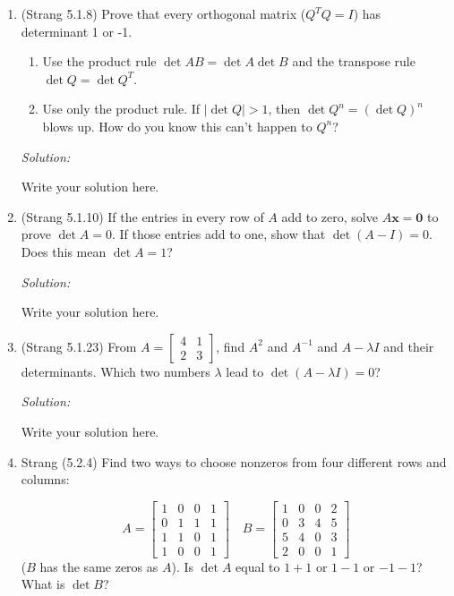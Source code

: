 \documentclass[11pt]{article}
\renewcommand{\vec}[1]{\ensuremath{\mathbf{#1}}}
\newenvironment{sol}
    {\emph{Solution:}
    }
\newcommand{\headings}{
\large{\textbf{YOUR NAME GOES HERE \hfill 21-241 Fall 2019}\\
\textbf{Homework 7 \hfill Due Friday, October 18}}\\
\rule[0.1in]{\textwidth}{0.01in}
}
\begin{document}
\headings




\begin{enumerate}
\section*{Required Problems}



\item (Strang 5.1.8) Prove that every orthogonal matrix ($Q^TQ=I$) has determinant 1 or -1.

\begin{enumerate}
\item Use the product rule $\det AB = \det A \det B$ and the transpose rule $\det Q = \det Q^T$.
\item Use only the product rule.  If $|\det Q|>1$, then $\det Q^n = (\det Q)^n$ blows up.  How do you know this can't happen to $Q^n$?
\end{enumerate}

 \begin{sol}
Write your solution here.
\end{sol}
\clearpage

\item (Strang 5.1.10) If the entries in every row of $A$ add to zero, solve $A\vec{x} = \vec{0}$ to prove $\det A = 0$. If those entries add to one, show that $\det(A-I) = 0$. Does this mean $\det A = 1$?

 \begin{sol}
Write your solution here.
\end{sol}
\clearpage

\item (Strang 5.1.23) From $A = \begin{bmatrix} 4 & 1 \\ 2 & 3 \end{bmatrix}$, find $A^2$ and $A^{-1}$ and $A-\lambda I$ and their determinants.  Which two numbers $\lambda$ lead to $\det (A- \lambda I) = 0$?


 \begin{sol}
Write your solution here.
\end{sol}
\clearpage

\item Strang (5.2.4) Find two ways to choose nonzeros from four different rows and columns:

\[A= \begin{bmatrix} 1 & 0 & 0 & 1 \\ 0 & 1 & 1 & 1 \\ 1 & 1 & 0 & 1 \\ 1 & 0 & 0 & 1 \end{bmatrix} \quad 
B = \begin{bmatrix} 1 & 0 & 0 & 2 \\ 0 & 3 & 4 & 5 \\ 5 & 4 & 0 & 3 \\ 2 & 0 & 0 & 1 \end{bmatrix}\]
($B$ has the same zeros as $A$). Is $\det A$ equal to $1+1$ or $1-1$ or $-1-1$?  What is $\det B$?


\end{enumerate}
\end{document}
